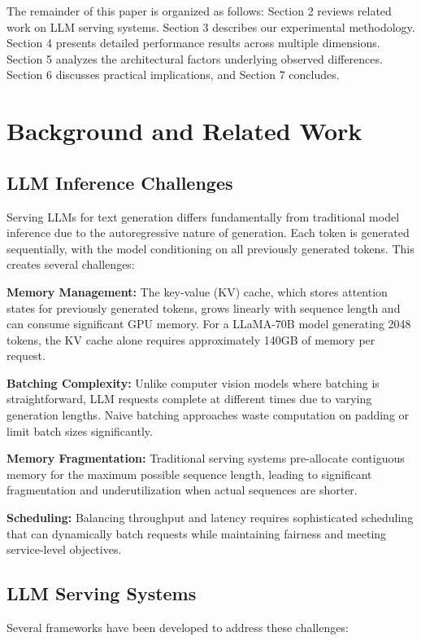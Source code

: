 \documentclass{article}
\begin{document}
The remainder of this paper is organized as follows: Section 2 reviews related work on LLM serving systems. Section 3 describes our experimental methodology. Section 4 presents detailed performance results across multiple dimensions. Section 5 analyzes the architectural factors underlying observed differences. Section 6 discusses practical implications, and Section 7 concludes.

\section{Background and Related Work}

\subsection{LLM Inference Challenges}

Serving LLMs for text generation differs fundamentally from traditional model inference due to the autoregressive nature of generation. Each token is generated sequentially, with the model conditioning on all previously generated tokens. This creates several challenges:

\textbf{Memory Management:} The key-value (KV) cache, which stores attention states for previously generated tokens, grows linearly with sequence length and can consume significant GPU memory. For a LLaMA-70B model generating 2048 tokens, the KV cache alone requires approximately 140GB of memory per request.

\textbf{Batching Complexity:} Unlike computer vision models where batching is straightforward, LLM requests complete at different times due to varying generation lengths. Naive batching approaches waste computation on padding or limit batch sizes significantly.

\textbf{Memory Fragmentation:} Traditional serving systems pre-allocate contiguous memory for the maximum possible sequence length, leading to significant fragmentation and underutilization when actual sequences are shorter.

\textbf{Scheduling:} Balancing throughput and latency requires sophisticated scheduling that can dynamically batch requests while maintaining fairness and meeting service-level objectives.

\subsection{LLM Serving Systems}

Several frameworks have been developed to address these challenges:
\end{document}
